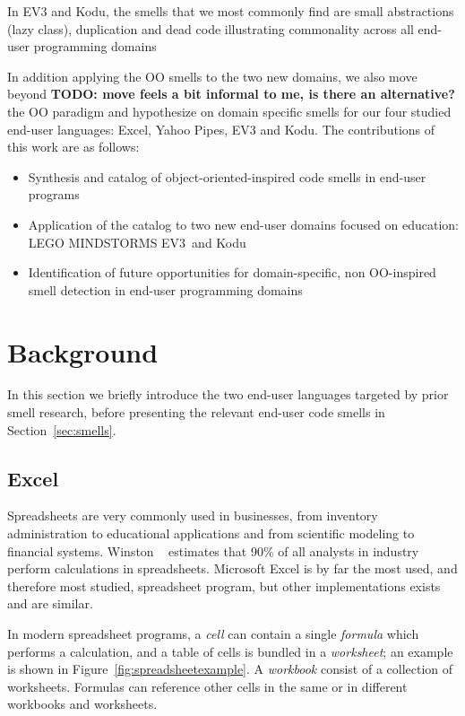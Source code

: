 \documentclass{sig-alternate}
\newcommand{\todo}[1]{\textbf{TODO: #1}}
\newcommand{\ms}{LEGO MINDSTORMS EV3}
\begin{document}
In EV3 and Kodu, the smells that we most commonly find are small abstractions (lazy class), duplication and dead code illustrating commonality across all end-user programming domains
  
In addition applying the OO smells to the two new domains, we also move beyond \todo{move feels a bit informal to me, is there an alternative?} the OO paradigm and hypothesize on domain specific smells for our four studied end-user languages: Excel, Yahoo Pipes, EV3 and Kodu. The contributions of this work are as follows:

\begin{itemize}
	\item Synthesis and catalog of object-oriented-inspired code smells in end-user programs
	\item Application of the catalog to two new end-user domains focused on education: \ms~and Kodu
	\item Identification of future opportunities for domain-specific, non OO-inspired smell detection in end-user programming domains
\end{itemize}

\section{Background}
\label{sec:background}
In this section we briefly introduce the two end-user languages targeted by prior smell research, before presenting the relevant end-user code smells in Section~\ref{sec:smells}.

\subsection{Excel} Spreadsheets are very commonly used in businesses, from inventory administration to educational applications and from scientific modeling to financial systems.
Winston ~\cite{Wins2001} estimates that 90\% of all analysts in industry perform calculations in spreadsheets. 
Microsoft Excel is by far the most used, and therefore most studied, spreadsheet program, but other implementations exists and are similar.

In modern spreadsheet programs, a \textit{cell} can contain a single \textit{formula} which performs a calculation, and a table of cells is bundled in a \textit{worksheet}; an example is shown in Figure~\ref{fig:spreadsheetexample}. 
A \textit{workbook} consist of a collection of worksheets.
Formulas can reference other cells in the same or in different workbooks and worksheets.
\end{document}

